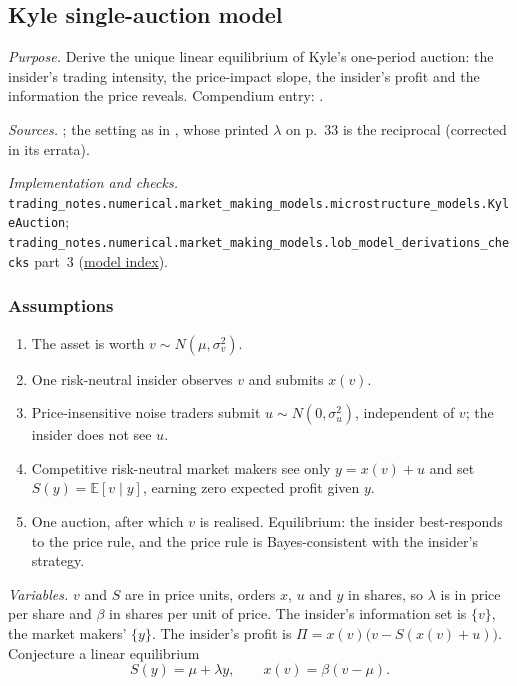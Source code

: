 \subsection{Kyle single-auction model}\label{drv:kyle-single-auction}

\emph{Purpose.} Derive the unique linear equilibrium of Kyle's one-period auction: the insider's trading intensity, the price-impact slope, the insider's profit and the information the price reveals. Compendium entry: .

\emph{Sources.} \citep[chap.~``Strategic Trader Models I: Informed Traders'', pp.~91--98, eqs.~(4.3)--(4.5), (4.17), (4.20)]{catalogue-0496}; the setting as in \citep[chap.~``A Primer on the Microstructure of Financial Markets'', pp.~31--32]{crypto-cartea}, whose printed $\lambda$ on p.~33 is the reciprocal (corrected in its errata).

\emph{Implementation and checks.} \nolinkurl{trading_notes.numerical.market_making_models.microstructure_models.KyleAuction}; \nolinkurl{trading_notes.numerical.market_making_models.lob_model_derivations_checks} part~3 (\hyperref[drv:model-index]{model index}).

\subsubsection{Assumptions}
\begin{enumerate}[label=\roman*.]
\setlength{\itemsep}{0pt}
\item The asset is worth $v\sim N(\mu,\sigma_v^2)$.
\item One risk-neutral insider observes $v$ and submits $x(v)$.
\item Price-insensitive noise traders submit $u\sim N(0,\sigma_u^2)$, independent of $v$; the insider does not see $u$.
\item Competitive risk-neutral market makers see only $y=x(v)+u$ and set $S(y)=\mathbb{E}[v\mid y]$, earning zero expected profit given $y$.
\item One auction, after which $v$ is realised. Equilibrium: the insider best-responds to the price rule, and the price rule is Bayes-consistent with the insider's strategy.
\end{enumerate}
\emph{Variables.} $v$ and $S$ are in price units, orders $x$, $u$ and $y$ in shares, so $\lambda$ is in price per share and $\beta$ in shares per unit of price. The insider's information set is $\{v\}$, the market makers' $\{y\}$. The insider's profit is $\Pi=x(v)\big(v-S(x(v)+u)\big)$. Conjecture a linear equilibrium
\[ S(y)=\mu+\lambda y,\qquad x(v)=\beta(v-\mu). \]

